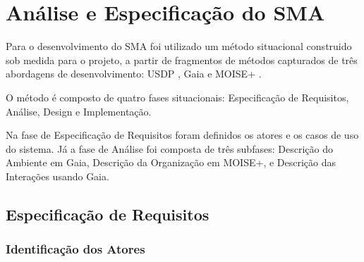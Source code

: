 \documentclass{llncs}
\begin{document}
\section{Análise e Especificação do SMA}



Para o desenvolvimento do SMA foi utilizado um método situacional construido sob medida para o projeto, a partir de fragmentos de métodos capturados de três abordagens de desenvolvimento: USDP \cite{USDP}, Gaia \cite{GAIA} e MOISE+ \cite{MOISE}.

O método é composto de quatro fases situacionais: Especificação de Requisitos, Análise, Design e Implementação.

Na fase de Especificação de Requisitos foram definidos os atores e os casos de uso do sistema. Já a fase de Análise foi composta de três subfases: Descrição do Ambiente em Gaia, Descrição da Organização em MOISE+, e Descrição das Interações usando Gaia.


\subsection{Especificação de Requisitos}


\subsubsection{Identificação dos Atores}
\end{document}
